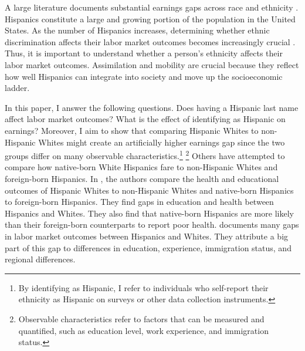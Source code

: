\documentclass[12pt,english]{article}
\begin{document}
A large literature documents substantial earnings gaps across race and ethnicity \autocite{bayer2018divergent, charles2008prejudice, card1992school, fryer2004causes, rubinstein2014pride, bertrand2004emily, juhn1991accounting}. Hispanics constitute a large and growing portion of the population in the United States. As the number of Hispanics increases, determining whether ethnic discrimination affects their labor market outcomes becomes increasingly crucial \autocite{chettyUnitedStatesStill2014, chettyEffectsExposureBetter2016,chettyFadingAmericanDream2017,abramitzkyImmigrantsAssimilateMore2020a, abramitzkyNationImmigrantsAssimilation2014,abramitzkyCulturalAssimilationAge2016,chettyWhereLandOpportunity2014}. Thus, it is important to understand whether a person's ethnicity affects their labor market outcomes. Assimilation and mobility are crucial because they reflect how well Hispanics can integrate into society and move up the socioeconomic ladder.

In this paper, I answer the following questions. Does having a Hispanic last name affect labor market outcomes? What is the effect of identifying as Hispanic on earnings? Moreover, I aim to show that comparing Hispanic Whites to non-Hispanic Whites might create an artificially higher earnings gap since the two groups differ on many observable characteristics.\footnote{By identifying as Hispanic, I refer to individuals who self-report their ethnicity as Hispanic on surveys or other data collection instruments.} \footnote{Observable characteristics refer to factors that can be measured and quantified, such as education level, work experience, and immigration status.} Others have attempted to compare how native-born White Hispanics fare to non-Hispanic Whites and foreign-born Hispanics. In \textcite{antman2020ethnic,antmanEthnicAttritionObserved2016,antmanEthnicAttritionObserved2016a,antmanEthnicAttritionAssimilation2020}, the authors compare the health and educational outcomes of Hispanic Whites to non-Hispanic Whites and native-born Hispanics to foreign-born Hispanics. They find gaps in education and health between Hispanics and Whites. They also find that native-born Hispanics are more likely than their foreign-born counterparts to report poor health. \textcite{davilaChangesRelativeEarnings2008} documents many gaps in labor market outcomes between Hispanics and Whites. They attribute a big part of this gap to differences in education, experience, immigration status, and regional differences. 
\end{document}
